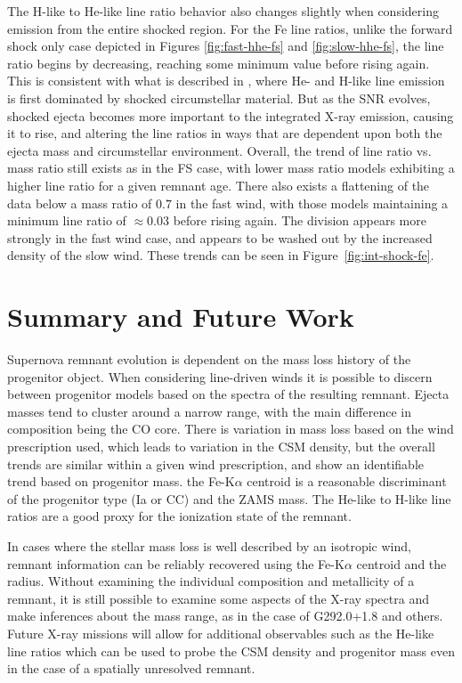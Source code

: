 \documentclass[twocolumn]{aastex631}
\begin{document}
The H-like to He-like line ratio behavior also changes slightly when considering emission from the entire shocked region. For the Fe line ratios, unlike the forward shock only case depicted in Figures \ref{fig:fast-hhe-fs} and \ref{fig:slow-hhe-fs}, the line ratio begins by decreasing, reaching some minimum value before rising again.  This is consistent with what is described in \citet{pat15}, where He- and H-like line emission is first dominated by shocked circumstellar material. But as the SNR evolves, shocked ejecta becomes more important to the integrated X-ray emission, causing it to rise, and altering the line ratios in ways that are dependent upon both the ejecta mass and circumstellar environment. Overall, the trend of line ratio vs. mass ratio still exists as in the FS case, with lower mass ratio models exhibiting a higher line ratio for a given remnant age. There also exists a flattening of the data below a mass ratio of $0.7$ in the fast wind, with those models maintaining a minimum line ratio of $\approx 0.03$ before rising again. The division appears more strongly in the fast wind case, and appears to be washed out by the increased density of the slow wind. These trends can be seen in Figure~\ref{fig:int-shock-fe}.

\section{Summary and Future Work}
\label{summary}
\indent Supernova remnant evolution is dependent on the mass loss history of the progenitor object. When considering line-driven winds it is possible to discern between progenitor models based on the spectra of the resulting remnant. Ejecta masses tend to cluster around a narrow range, with the main difference in composition being the CO core. There is variation in mass loss based on the wind prescription used, which leads to variation in the CSM density, but the overall trends are similar within a given wind prescription, and show an identifiable trend based on progenitor mass. the Fe-K$\alpha$ centroid is a reasonable discriminant of the progenitor type (Ia or CC) and the ZAMS mass. The He-like to H-like line ratios are a good proxy for the ionization state of the remnant. 

In cases where the stellar mass loss is well described by an isotropic wind, remnant information can be reliably recovered using the Fe-K$\alpha$ centroid and the radius. Without examining the individual composition and metallicity of a remnant, it is still possible to examine some aspects of the X-ray spectra and make inferences about the mass range, as in the case of G292.0+1.8 and others. Future X-ray missions will allow for additional observables such as the He-like line ratios which can be used to probe the CSM density and progenitor mass even in the case of a spatially unresolved remnant.
\end{document}
